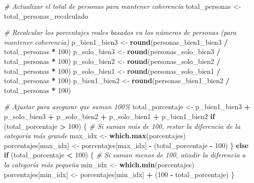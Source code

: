 \documentclass[
]{article}
\newenvironment{Shaded}{\begin{snugshade}}{\end{snugshade}}
\newcommand{\CommentTok}[1]{\textcolor[rgb]{0.56,0.35,0.01}{\textit{#1}}}
\newcommand{\ControlFlowTok}[1]{\textcolor[rgb]{0.13,0.29,0.53}{\textbf{#1}}}
\newcommand{\DecValTok}[1]{\textcolor[rgb]{0.00,0.00,0.81}{#1}}
\newcommand{\FunctionTok}[1]{\textcolor[rgb]{0.13,0.29,0.53}{\textbf{#1}}}
\newcommand{\NormalTok}[1]{#1}
\newcommand{\OtherTok}[1]{\textcolor[rgb]{0.56,0.35,0.01}{#1}}
\newcommand{\SpecialCharTok}[1]{\textcolor[rgb]{0.81,0.36,0.00}{\textbf{#1}}}
\begin{document}
\begin{Shaded}
\begin{Highlighting}[]
\CommentTok{\# Actualizar el total de personas para mantener coherencia}
\NormalTok{total\_personas }\OtherTok{\textless{}{-}}\NormalTok{ total\_personas\_recalculado}

\CommentTok{\# Recalcular los porcentajes reales basados en los números de personas (para mantener coherencia)}
\NormalTok{p\_bien1\_bien3 }\OtherTok{\textless{}{-}} \FunctionTok{round}\NormalTok{(personas\_bien1\_bien3 }\SpecialCharTok{/}\NormalTok{ total\_personas }\SpecialCharTok{*} \DecValTok{100}\NormalTok{)}
\NormalTok{p\_solo\_bien3 }\OtherTok{\textless{}{-}} \FunctionTok{round}\NormalTok{(personas\_solo\_bien3 }\SpecialCharTok{/}\NormalTok{ total\_personas }\SpecialCharTok{*} \DecValTok{100}\NormalTok{)}
\NormalTok{p\_solo\_bien2 }\OtherTok{\textless{}{-}} \FunctionTok{round}\NormalTok{(personas\_solo\_bien2 }\SpecialCharTok{/}\NormalTok{ total\_personas }\SpecialCharTok{*} \DecValTok{100}\NormalTok{)}
\NormalTok{p\_solo\_bien1 }\OtherTok{\textless{}{-}} \FunctionTok{round}\NormalTok{(personas\_solo\_bien1 }\SpecialCharTok{/}\NormalTok{ total\_personas }\SpecialCharTok{*} \DecValTok{100}\NormalTok{)}
\NormalTok{p\_bien1\_bien2 }\OtherTok{\textless{}{-}} \FunctionTok{round}\NormalTok{(personas\_bien1\_bien2 }\SpecialCharTok{/}\NormalTok{ total\_personas }\SpecialCharTok{*} \DecValTok{100}\NormalTok{)}

\CommentTok{\# Ajustar para asegurar que suman 100\%}
\NormalTok{total\_porcentaje }\OtherTok{\textless{}{-}}\NormalTok{ p\_bien1\_bien3 }\SpecialCharTok{+}\NormalTok{ p\_solo\_bien3 }\SpecialCharTok{+}\NormalTok{ p\_solo\_bien2 }\SpecialCharTok{+}\NormalTok{ p\_solo\_bien1 }\SpecialCharTok{+}\NormalTok{ p\_bien1\_bien2}
\ControlFlowTok{if}\NormalTok{ (total\_porcentaje }\SpecialCharTok{\textgreater{}} \DecValTok{100}\NormalTok{) \{}
  \CommentTok{\# Si suman más de 100, restar la diferencia de la categoría más grande}
\NormalTok{  max\_idx }\OtherTok{\textless{}{-}} \FunctionTok{which.max}\NormalTok{(porcentajes)}
\NormalTok{  porcentajes[max\_idx] }\OtherTok{\textless{}{-}}\NormalTok{ porcentajes[max\_idx] }\SpecialCharTok{{-}}\NormalTok{ (total\_porcentaje }\SpecialCharTok{{-}} \DecValTok{100}\NormalTok{)}
\NormalTok{\} }\ControlFlowTok{else} \ControlFlowTok{if}\NormalTok{ (total\_porcentaje }\SpecialCharTok{\textless{}} \DecValTok{100}\NormalTok{) \{}
  \CommentTok{\# Si suman menos de 100, añadir la diferencia a la categoría más pequeña}
\NormalTok{  min\_idx }\OtherTok{\textless{}{-}} \FunctionTok{which.min}\NormalTok{(porcentajes)}
\NormalTok{  porcentajes[min\_idx] }\OtherTok{\textless{}{-}}\NormalTok{ porcentajes[min\_idx] }\SpecialCharTok{+}\NormalTok{ (}\DecValTok{100} \SpecialCharTok{{-}}\NormalTok{ total\_porcentaje)}
\NormalTok{\}}


\end{Highlighting}
\end{Shaded}
\end{document}
